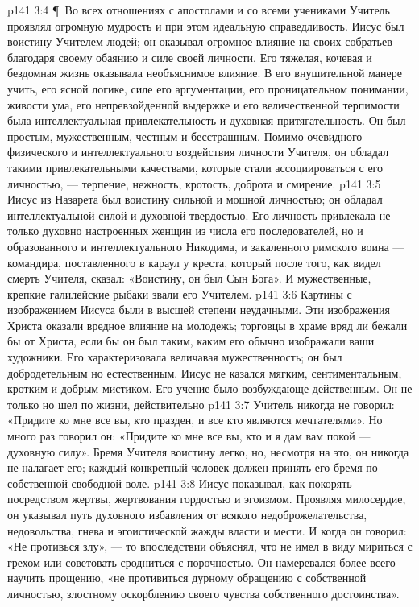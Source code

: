 \vs p141 3:4 \P\ Во всех отношениях с апостолами и со всеми учениками Учитель проявлял огромную мудрость и при этом идеальную справедливость. Иисус был воистину Учителем людей; он оказывал огромное влияние на своих собратьев благодаря своему обаянию и силе своей личности. Его тяжелая, кочевая и бездомная жизнь оказывала необъяснимое влияние. В его внушительной манере учить, его ясной логике, силе его аргументации, его проницательном понимании, живости ума, его непревзойденной выдержке и его величественной терпимости была интеллектуальная привлекательность и духовная притягательность. Он был простым, мужественным, честным и бесстрашным. Помимо очевидного физического и интеллектуального воздействия личности Учителя, он обладал такими привлекательными качествами, которые стали ассоциироваться с его личностью, --- терпение, нежность, кротость, доброта и смирение.
\vs p141 3:5 Иисус из Назарета был воистину сильной и мощной личностью; он обладал интеллектуальной силой и духовной твердостью. Его личность привлекала не только духовно настроенных женщин из числа его последователей, но и образованного и интеллектуального Никодима, и закаленного римского воина --- командира, поставленного в караул у креста, который после того, как видел смерть Учителя, сказал: «Воистину, он был Сын Бога». И мужественные, крепкие галилейские рыбаки звали его Учителем.
\vs p141 3:6 Картины с изображением Иисуса были в высшей степени неудачными. Эти изображения Христа оказали вредное влияние на молодежь; торговцы в храме вряд ли бежали бы от Христа, если бы он был таким, каким его обычно изображали ваши художники. Его характеризовала величавая мужественность; он был добродетельным но естественным. Иисус не казался мягким, сентиментальным, кротким и добрым мистиком. Его учение было возбуждающе действенным. Он не только  но шел по жизни, действительно 
\vs p141 3:7 Учитель никогда не говорил: «Придите ко мне все вы, кто празден, и все кто являются мечтателями». Но много раз говорил он: «Придите ко мне все вы, кто  и я дам вам покой --- духовную силу». Бремя Учителя воистину легко, но, несмотря на это, он никогда не налагает его; каждый конкретный человек должен принять его бремя по собственной свободной воле.
\vs p141 3:8 Иисус показывал, как покорять посредством жертвы, жертвования гордостью и эгоизмом. Проявляя милосердие, он указывал путь духовного избавления от всякого недоброжелательства, недовольства, гнева и эгоистической жажды власти и мести. И когда он говорил: «Не противься злу», --- то впоследствии объяснял, что не имел в виду мириться с грехом или советовать сродниться с порочностью. Он намеревался более всего научить прощению, «не противиться дурному обращению с собственной личностью, злостному оскорблению своего чувства собственного достоинства».
